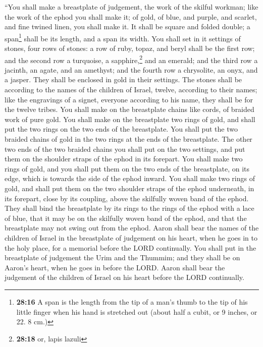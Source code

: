  ``You shall make a breastplate of judgement, the work of
the skilful workman; like the work of the ephod you shall make it; of
gold, of blue, and purple, and scarlet, and fine twined linen, you shall
make it.  It shall be square and folded double; a
span\footnote{\textbf{28:16} A span is the length from the tip of a
  man's thumb to the tip of his little finger when his hand is stretched
  out (about half a cubit, or 9 inches, or 22. 8 cm.)} shall be its
length, and a span its width.  You shall set in it
settings of stones, four rows of stones: a row of ruby, topaz, and beryl
shall be the first row;  and the second row a turquoise,
a sapphire,\footnote{\textbf{28:18} or, lapis lazuli} and an emerald;
 and the third row a jacinth, an agate, and an amethyst;
 and the fourth row a chrysolite, an onyx, and a jasper.
They shall be enclosed in gold in their settings.  The
stones shall be according to the names of the children of Israel,
twelve, according to their names; like the engravings of a signet,
everyone according to his name, they shall be for the twelve tribes.
 You shall make on the breastplate chains like cords, of
braided work of pure gold.  You shall make on the
breastplate two rings of gold, and shall put the two rings on the two
ends of the breastplate.  You shall put the two braided
chains of gold in the two rings at the ends of the breastplate.
 The other two ends of the two braided chains you shall
put on the two settings, and put them on the shoulder straps of the
ephod in its forepart.  You shall make two rings of gold,
and you shall put them on the two ends of the breastplate, on its edge,
which is towards the side of the ephod inward.  You shall
make two rings of gold, and shall put them on the two shoulder straps of
the ephod underneath, in its forepart, close by its coupling, above the
skilfully woven band of the ephod.  They shall bind the
breastplate by its rings to the rings of the ephod with a lace of blue,
that it may be on the skilfully woven band of the ephod, and that the
breastplate may not swing out from the ephod.  Aaron
shall bear the names of the children of Israel in the breastplate of
judgement on his heart, when he goes in to the holy place, for a
memorial before the LORD continually.  You shall put in
the breastplate of judgement the Urim and the Thummim; and they shall be
on Aaron's heart, when he goes in before the LORD. Aaron shall bear the
judgement of the children of Israel on his heart before the LORD
continually.

